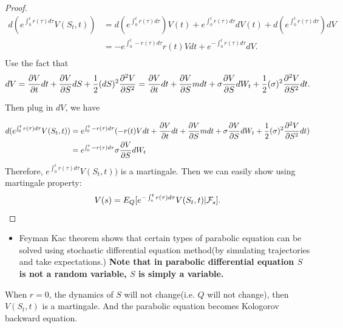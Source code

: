 \begin{refsection}
\begin{proof}
	\begin{align*}
	d(e^{\int_0^t r(\tau) d\tau}V(S_t,t)) & = d (e^{\int_0^t r(\tau) d\tau}) V(t) + e^{\int_0^t r(\tau) d\tau} dV(t) + d(e^{\int_0^t r(\tau) d\tau}) dV \\
	& = -e^{\int_0^t -r(\tau) d\tau} r(t) V dt + e^{-\int_0^t r(\tau) d\tau} dV.\\ 
	\end{align*}
	Use the fact that
	$$dV = \frac{\partial V}{\partial t} dt + \frac{\partial V}{\partial S} dS + \frac{1}{2} (dS)^2 \frac{\partial^2 V}{\partial S^2} = \frac{\partial V}{\partial t} dt + \frac{\partial V}{\partial S} mdt + \sigma \frac{\partial V}{\partial S} dW_t + \frac{1}{2} (\sigma)^2 \frac{\partial^2 V}{\partial S^2} dt.$$
	
	Then plug in $dV$, we have
	
	\begin{align*}
	d(e^{\int_0^t r(\tau) d\tau}V(S_t,t)) &= e^{\int_0^t -r(\tau) d\tau}( -r(t) V dt + \frac{\partial V}{\partial t} dt + \frac{\partial V}{\partial S} mdt + \sigma \frac{\partial V}{\partial S} dW_t + \frac{1}{2} (\sigma)^2 \frac{\partial^2 V}{\partial S^2} dt) \\
	&=e^{\int_0^t -r(\tau) d\tau} \sigma \frac{\partial V}{\partial S} dW_t
	\end{align*}
	Therefore, $e^{\int_0^t r(\tau) d\tau}V(S_t,t))$ is a martingale.
	Then we can easily show using martingale property:
	$$V(s) = E_Q[e^{-\int_s^t r(\tau) d\tau}V(S_t,t)|\mathcal{F}_s].$$
\end{proof}


\begin{remark}\hfill
	\begin{itemize}
		\item Feyman Kac theorem shows that certain types of parabolic equation can be solved using stochastic differential equation method(by simulating trajectories and take expectations.) \textbf{Note that in parabolic differential equation $S$ is not a random variable, $S$ is simply a variable.}
	\end{itemize}
\end{remark}



\begin{remark}[special case of $r = 0$]
	When $r = 0$, the dynamics of $S$ will not change(i.e. $Q$ will not change), then $V(S_t,t)$ is a martingale. And the parabolic equation becomes Kologorov backward equation.
\end{remark}



\end{refsection}

